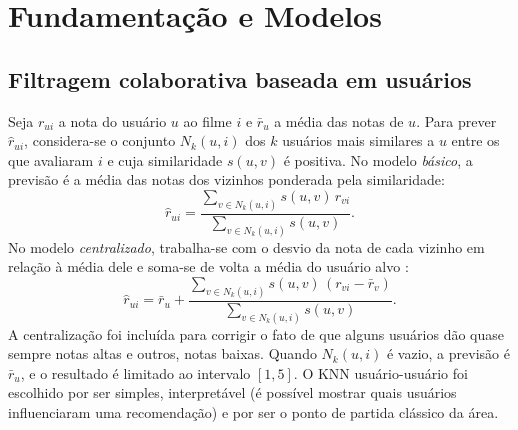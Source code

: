 \documentclass[conference]{IEEEtran}
\begin{document}
\section{Fundamenta\c{c}\~ao e Modelos}
\subsection{Filtragem colaborativa baseada em usu\'arios}
Seja $r_{ui}$ a nota do usu\'ario $u$ ao filme $i$ e $\bar{r}_u$ a m\'edia das notas de $u$. Para prever $\hat{r}_{ui}$, considera-se o conjunto $N_k(u,i)$ dos $k$ usu\'arios mais similares a $u$ entre os que avaliaram $i$ e cuja similaridade $s(u,v)$ \'e positiva. No modelo \emph{b\'asico}, a previs\~ao \'e a m\'edia das notas dos vizinhos ponderada pela similaridade:
\begin{equation}
\hat{r}_{ui}=\frac{\sum_{v\in N_k(u,i)} s(u,v)\, r_{vi}}{\sum_{v\in N_k(u,i)} s(u,v)}.
\end{equation}
No modelo \emph{centralizado}, trabalha-se com o desvio da nota de cada vizinho em rela\c{c}\~ao \`a m\'edia dele e soma-se de volta a m\'edia do usu\'ario alvo \cite{herlocker1999}:
\begin{equation}
\hat{r}_{ui}=\bar{r}_u+\frac{\sum_{v\in N_k(u,i)} s(u,v)\,(r_{vi}-\bar{r}_v)}{\sum_{v\in N_k(u,i)} s(u,v)}.
\end{equation}
A centraliza\c{c}\~ao foi inclu\'ida para corrigir o fato de que alguns usu\'arios d\~ao quase sempre notas altas e outros, notas baixas. Quando $N_k(u,i)$ \'e vazio, a previs\~ao \'e $\bar{r}_u$, e o resultado \'e limitado ao intervalo $[1,5]$. O KNN usu\'ario-usu\'ario foi escolhido por ser simples, interpret\'avel (\'e poss\'ivel mostrar quais usu\'arios influenciaram uma recomenda\c{c}\~ao) e por ser o ponto de partida cl\'assico da \'area.
\end{document}
